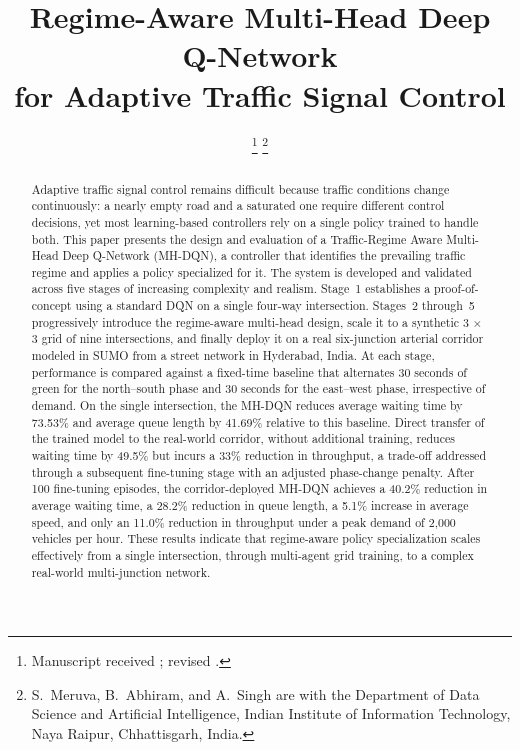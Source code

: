 \documentclass[lettersize,journal]{IEEEtran}
\begin{document}

\title{Regime-Aware Multi-Head Deep Q-Network\\
       for Adaptive Traffic Signal Control}

\author{
%
\thanks{Manuscript received ; revised .}%
\thanks{S.~Meruva, B.~Abhiram, and A.~Singh are with the Department of Data
Science and Artificial Intelligence, Indian Institute of Information
Technology, Naya Raipur, Chhattisgarh, India.}}

\maketitle

\begin{abstract}
Adaptive traffic signal control remains difficult because traffic conditions
change continuously: a nearly empty road and a saturated one require
different control decisions, yet most learning-based controllers rely on a
single policy trained to handle both. This paper presents the design and
evaluation of a Traffic-Regime Aware Multi-Head Deep Q-Network (MH-DQN), a
controller that identifies the prevailing traffic regime and applies a
policy specialized for it. The system is developed and validated across five
stages of increasing complexity and realism. Stage~1 establishes a
proof-of-concept using a standard DQN on a single four-way intersection.
Stages~2 through~5 progressively introduce the regime-aware multi-head
design, scale it to a synthetic 3 $\times$ 3 grid of nine intersections, and
finally deploy it on a real six-junction arterial corridor modeled in SUMO
from a street network in Hyderabad, India. At each stage, performance is
compared against a fixed-time baseline that alternates 30 seconds of green
for the north--south phase and 30 seconds for the east--west phase,
irrespective of demand. On the single intersection, the MH-DQN reduces
average waiting time by 73.53\% and average queue length by 41.69\% relative
to this baseline. Direct transfer of the trained model to the real-world
corridor, without additional training, reduces waiting time by 49.5\% but
incurs a 33\% reduction in throughput, a trade-off addressed through a
subsequent fine-tuning stage with an adjusted phase-change penalty. After
100 fine-tuning episodes, the corridor-deployed MH-DQN achieves a 40.2\%
reduction in average waiting time, a 28.2\% reduction in queue length, a
5.1\% increase in average speed, and only an 11.0\% reduction in throughput
under a peak demand of 2,000 vehicles per hour. These results indicate that
regime-aware policy specialization scales effectively from a single
intersection, through multi-agent grid training, to a complex real-world
multi-junction network.
\end{abstract}
\end{document}
